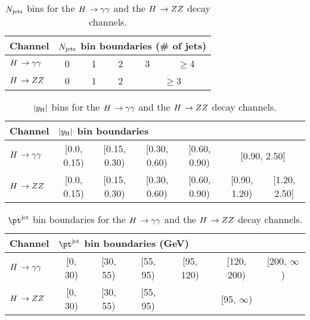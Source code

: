 \begin{table}[htbH]
\begin{center}
\begin{tabular}{|l|c|c|c|c|c|}
\hline
Channel & \multicolumn{5}{l|}{$N_\text{jets}$ bin boundaries (\# of jets)} \\
\hline
$H\,\to\gamma\gamma$ & 0 & 1 & 2 & 3 & $\ge$4 \\
\hline
$H\,\to ZZ$ & 0 & 1 & 2 & \multicolumn{2}{c|}{$\ge$3} \\
\hline
\end{tabular}
\end{center}
\caption{
    $N_\text{jets}$ bins for the $H\,\to\gamma\gamma$ and the $H\,\to ZZ$ decay channels.
    }
\label{tab:binningnjets}
\end{table}

\begin{table}[htbH]
\begin{center}
\begin{tabular}{|l|c|c|c|c|c|c|}
\hline
Channel & \multicolumn{6}{l|}{$\left|y_\text{H}\right|$ bin boundaries} \\
\hline
$H\,\to\gamma\gamma$ & [0.0, 0.15) & [0.15, 0.30) & [0.30, 0.60) & [0.60, 0.90) & \multicolumn{2}{c|}{[0.90, 2.50]} \\
\hline
$H\,\to ZZ$ & [0.0, 0.15) & [0.15, 0.30) & [0.30, 0.60) & [0.60, 0.90) & [0.90, 1.20) & [1.20, 2.50] \\
\hline
\end{tabular}
\end{center}
\caption{
    $\left|y_\text{H}\right|$ bins for the $H\,\to\gamma\gamma$ and the $H\,\to ZZ$ decay channels.
    }
\label{tab:binningabsy}
\end{table}

\begin{table}[h!]
\begin{center}
\begin{tabular}{|l|c|c|c|c|c|c|}
\hline
Channel & \multicolumn{6}{l|}{$\ptjet$ bin boundaries (GeV)} \\
\hline
$H\,\to\gamma\gamma$ & [0, 30) & [30, 55) & [55, 95) & [95, 120) & [120, 200) & [200, $\infty$) \\
\hline
$H\,\to ZZ$ & [0, 30) & [30, 55) & [55, 95) & \multicolumn{3}{c|}{ [95, $\infty$) } \\
\hline
\end{tabular}
\end{center}
\caption{
    $\ptjet$ bin boundaries for the $H\,\to\gamma\gamma$ and the $H\,\to ZZ$ decay channels.
    }
\label{tab:binningptjet}
\end{table}
